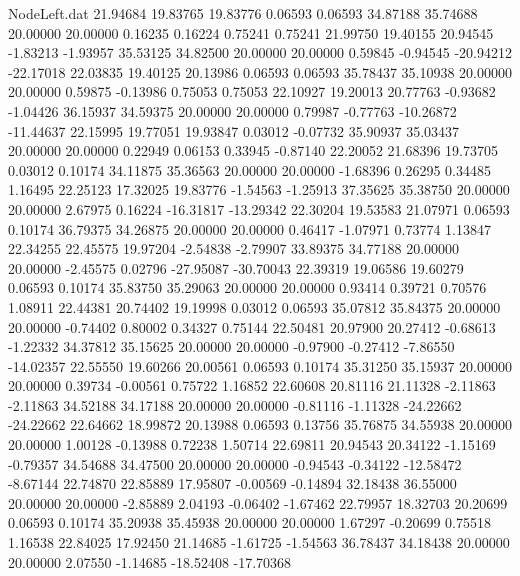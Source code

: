 \begin{filecontents}{NodeLeft.dat}
  21.94684   19.83765   19.83776     0.06593    0.06593   34.87188   35.74688   20.00000   20.00000    0.16235    0.16224    0.75241    0.75241
  21.99750   19.40155   20.94545    -1.83213   -1.93957   35.53125   34.82500   20.00000   20.00000    0.59845   -0.94545  -20.94212  -22.17018
  22.03835   19.40125   20.13986     0.06593    0.06593   35.78437   35.10938   20.00000   20.00000    0.59875   -0.13986    0.75053    0.75053
  22.10927   19.20013   20.77763    -0.93682   -1.04426   36.15937   34.59375   20.00000   20.00000    0.79987   -0.77763  -10.26872  -11.44637
  22.15995   19.77051   19.93847     0.03012   -0.07732   35.90937   35.03437   20.00000   20.00000    0.22949    0.06153    0.33945   -0.87140
  22.20052   21.68396   19.73705     0.03012    0.10174   34.11875   35.36563   20.00000   20.00000   -1.68396    0.26295    0.34485    1.16495
  22.25123   17.32025   19.83776    -1.54563   -1.25913   37.35625   35.38750   20.00000   20.00000    2.67975    0.16224  -16.31817  -13.29342
  22.30204   19.53583   21.07971     0.06593    0.10174   36.79375   34.26875   20.00000   20.00000    0.46417   -1.07971    0.73774    1.13847
  22.34255   22.45575   19.97204    -2.54838   -2.79907   33.89375   34.77188   20.00000   20.00000   -2.45575    0.02796  -27.95087  -30.70043
  22.39319   19.06586   19.60279     0.06593    0.10174   35.83750   35.29063   20.00000   20.00000    0.93414    0.39721    0.70576    1.08911
  22.44381   20.74402   19.19998     0.03012    0.06593   35.07812   35.84375   20.00000   20.00000   -0.74402    0.80002    0.34327    0.75144
  22.50481   20.97900   20.27412    -0.68613   -1.22332   34.37812   35.15625   20.00000   20.00000   -0.97900   -0.27412   -7.86550  -14.02357
  22.55550   19.60266   20.00561     0.06593    0.10174   35.31250   35.15937   20.00000   20.00000    0.39734   -0.00561    0.75722    1.16852
  22.60608   20.81116   21.11328    -2.11863   -2.11863   34.52188   34.17188   20.00000   20.00000   -0.81116   -1.11328  -24.22662  -24.22662
  22.64662   18.99872   20.13988     0.06593    0.13756   35.76875   34.55938   20.00000   20.00000    1.00128   -0.13988    0.72238    1.50714
  22.69811   20.94543   20.34122    -1.15169   -0.79357   34.54688   34.47500   20.00000   20.00000   -0.94543   -0.34122  -12.58472   -8.67144
  22.74870   22.85889   17.95807    -0.00569   -0.14894   32.18438   36.55000   20.00000   20.00000   -2.85889    2.04193   -0.06402   -1.67462
  22.79957   18.32703   20.20699     0.06593    0.10174   35.20938   35.45938   20.00000   20.00000    1.67297   -0.20699    0.75518    1.16538
  22.84025   17.92450   21.14685    -1.61725   -1.54563   36.78437   34.18438   20.00000   20.00000    2.07550   -1.14685  -18.52408  -17.70368

\end{filecontents}
